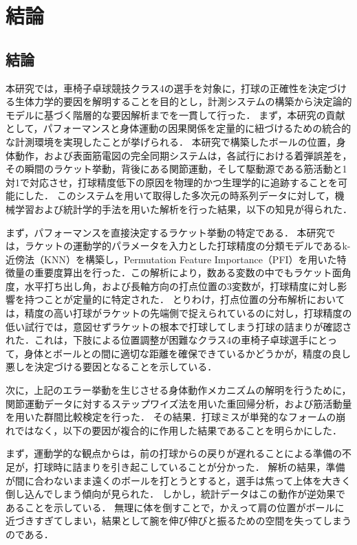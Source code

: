 \documentclass[../main]{subfiles}
\begin{document}
\chapter{結論}
\label{cp:conclusion}
\thispagestyle{empty}
\minitoc
\newpage

\section{結論}
\label{sec:conc_conclusion}
本研究では，車椅子卓球競技クラス4の選手を対象に，打球の正確性を決定づける生体力学的要因を解明することを目的とし，計測システムの構築から決定論的モデルに基づく階層的な要因解析までを一貫して行った．
まず，本研究の貢献として，パフォーマンスと身体運動の因果関係を定量的に紐づけるための統合的な計測環境を実現したことが挙げられる．
本研究で構築したボールの位置，身体動作，および表面筋電図の完全同期システムは，各試行における着弾誤差を，その瞬間のラケット挙動，背後にある関節運動，そして駆動源である筋活動と1対1で対応させ，打球精度低下の原因を物理的かつ生理学的に追跡することを可能にした．
このシステムを用いて取得した多次元の時系列データに対して，機械学習および統計学的手法を用いた解析を行った結果，以下の知見が得られた．


まず，パフォーマンスを直接決定するラケット挙動の特定である．
本研究では，ラケットの運動学的パラメータを入力とした打球精度の分類モデルであるk-近傍法（KNN）を構築し，Permutation Feature Importance（PFI）を用いた特徴量の重要度算出を行った．この解析により，数ある変数の中でもラケット面角度，水平打ち出し角，および長軸方向の打点位置の3変数が，打球精度に対し影響を持つことが定量的に特定された．
とりわけ，打点位置の分布解析においては，精度の高い打球がラケットの先端側で捉えられているのに対し，打球精度の低い試行では，意図せずラケットの根本で打球してしまう打球の詰まりが確認された．これは，下肢による位置調整が困難なクラス4の車椅子卓球選手にとって，身体とボールとの間に適切な距離を確保できているかどうかが，精度の良し悪しを決定づける要因となることを示している．

次に，上記のエラー挙動を生じさせる身体動作メカニズムの解明を行うために，関節運動データに対するステップワイズ法を用いた重回帰分析，および筋活動量を用いた群間比較検定を行った．
その結果．打球ミスが単発的なフォームの崩れではなく，以下の要因が複合的に作用した結果であることを明らかにした．

まず，運動学的な観点からは，前の打球からの戻りが遅れることによる準備の不足が，打球時に詰まりを引き起こしていることが分かった．
解析の結果，準備が間に合わないまま遠くのボールを打とうとすると，選手は焦って上体を大きく倒し込んでしまう傾向が見られた．
しかし，統計データはこの動作が逆効果であることを示している．
無理に体を倒すことで，かえって肩の位置がボールに近づきすぎてしまい，結果として腕を伸び伸びと振るための空間を失ってしまうのである．
\end{document}
